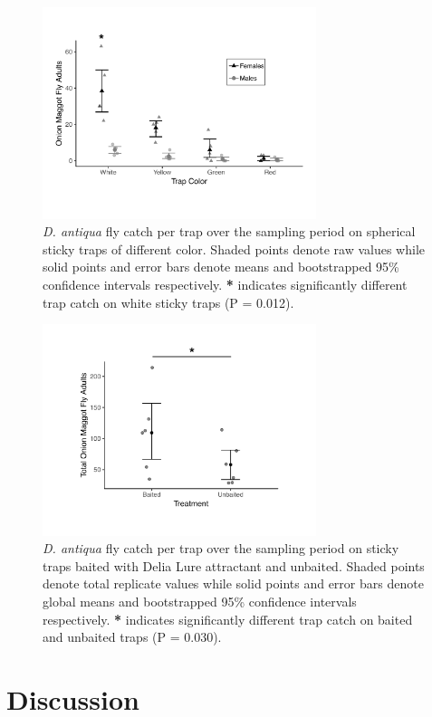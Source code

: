 \documentclass[alpha-refs]{wiley-article}
\begin{document}
\begin{figure}[bt]
\centering
\includegraphics[width = 8cm]{figures/publication/figure-3.pdf}
\caption{\textit{D. antiqua} fly catch per trap over the sampling period on spherical sticky traps of different color.  Shaded points denote raw values while solid points and error bars denote means and bootstrapped 95\% confidence intervals respectively.  \textbf{*} indicates significantly different trap catch on white sticky traps (P = 0.012).}
\label{fig:figure3}
\end{figure}


\begin{figure}[bt]
\centering
\includegraphics[width = 8cm]{figures/publication/figure-4.pdf}
\caption{\textit{D. antiqua} fly catch per trap over the sampling period on sticky traps baited with Delia Lure attractant and unbaited.  Shaded points denote total replicate values while solid points and error bars denote global means and bootstrapped 95\% confidence intervals respectively.  \textbf{*} indicates significantly different trap catch on baited and unbaited traps (P = 0.030). }
\label{fig:figure4}
\end{figure}


\section{Discussion}
\end{document}
